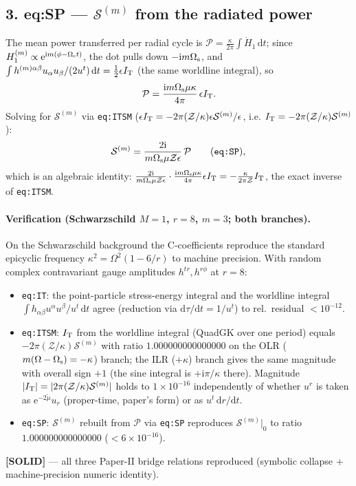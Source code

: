 \documentclass{article}
\newcommand{\rmi}{\mathrm{i}}
\newcommand{\rmd}{\mathrm{d}}
\newcommand{\rme}{\mathrm{e}}
\newcommand{\mass}{\mu}
\newcommand{\mmu}{\tilde\mu}
\begin{document}
\subsection*{3. eq:SP --- $\mathcal{S}^{(m)}$ from the radiated power}

The mean power transferred per radial cycle is $\mathcal{P}=\tfrac{\kappa}{2\pi}\int\dot H_1\,\rmd t$; since
$H_1^{(m)}\propto\rme^{\rmi m(\phi-\Omega_{\rm s}t)}$, the dot pulls down $-\rmi m\Omega_{\rm s}$, and
$\int h^{(m)\alpha\beta}u_\alpha u_\beta/(2u^t)\,\rmd t=\tfrac12\epsilon I_{\rm T}$ (the same worldline integral),
so
\begin{equation}
  \mathcal{P}=\frac{\rmi m\Omega_{\rm s}\mass\kappa}{4\pi}\,\epsilon I_{\rm T}.
\end{equation}
Solving for $\mathcal{S}^{(m)}$ via \texttt{eq:ITSM} ($\epsilon I_{\rm T}=-2\pi(\mathcal{Z}/\kappa)
\epsilon\mathcal{S}^{(m)}/\epsilon$, i.e. $I_{\rm T}=-2\pi(\mathcal{Z}/\kappa)\mathcal{S}^{(m)}$):
\begin{equation}
  \mathcal{S}^{(m)}=\frac{2\rmi}{m\Omega_{\rm s}\mass\mathcal{Z}\epsilon}\,\mathcal{P}\qquad(\texttt{eq:SP}),
\end{equation}
which is an algebraic identity: $\tfrac{2\rmi}{m\Omega_{\rm s}\mass\mathcal{Z}\epsilon}\cdot
\tfrac{\rmi m\Omega_{\rm s}\mass\kappa}{4\pi}\epsilon I_{\rm T}=-\tfrac{\kappa}{2\pi\mathcal{Z}}I_{\rm T}$, the
exact inverse of \texttt{eq:ITSM}.

\paragraph{Verification (Schwarzschild $M=1$, $r=8$, $m=3$; both branches).}
On the Schwarzschild background the C-coefficients reproduce the standard epicyclic frequency
$\kappa^2=\Omega^2(1-6/r)$ to machine precision. With random complex contravariant gauge amplitudes
$h^{tr},h^{r\phi}$ at $r=8$:
\begin{itemize}
\item \texttt{eq:IT}: the point-particle stress-energy integral and the worldline integral
$\int h_{\alpha\beta}u^\alpha u^\beta/u^t\,\rmd t$ agree (reduction via $\rmd\tau/\rmd t=1/u^t$) to
rel.\ residual $<10^{-12}$.
\item \texttt{eq:ITSM}: $I_{\rm T}$ from the worldline integral (QuadGK over one period) equals
$-2\pi(\mathcal{Z}/\kappa)\mathcal{S}^{(m)}$ with ratio $1.000000000000000$ on the OLR ($m(\Omega-\Omega_{\rm s})
=-\kappa$) branch; the ILR ($+\kappa$) branch gives the same magnitude with overall sign $+1$ (the sine integral
is $+\rmi\pi/\kappa$ there). Magnitude $|I_{\rm T}|=|2\pi(\mathcal{Z}/\kappa)\mathcal{S}^{(m)}|$ holds to
$1\times10^{-16}$ independently of whether $u^r$ is taken as $\rme^{-2\mmu}u_r$ (proper-time, paper's form) or
as $u^t\,\rmd r/\rmd t$.
\item \texttt{eq:SP}: $\mathcal{S}^{(m)}$ rebuilt from $\mathcal{P}$ via \texttt{eq:SP} reproduces
$\mathcal{S}^{(m)}|_0$ to ratio $1.000000000000000$ ($<6\times10^{-16}$).
\end{itemize}
\textbf{[SOLID]} --- all three Paper-II bridge relations reproduced (symbolic collapse $+$ machine-precision
numeric identity).
\end{document}
